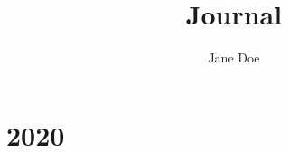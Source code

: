 \documentclass[nobib,a4paper]{tufte-book}
\title{Journal} %
\author[Jane Doe]{Jane Doe} %
\begin{document}

\frontmatter

\maketitle





\tableofcontents %


\mainmatter

\chapter{2020} %




\backmatter


\end{document}
